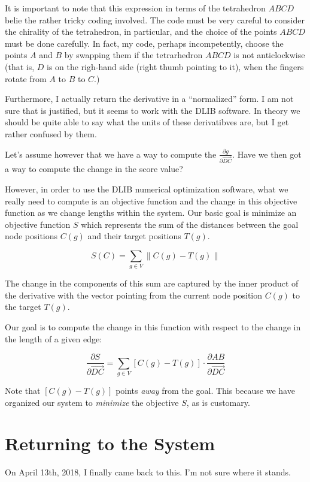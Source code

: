 \documentclass[11pt]{article}
\begin{document}
 It is important to note that this expression in terms of the tetrahedron $ABCD$ belie the rather tricky coding
 involved. The code must be very careful to consider the chirality of the tetrahedron, in particular, and
 the choice of the points $ABCD$ must be done carefully. In fact, my code, perhaps incompetently, choose the points $A$ and $B$
 by swapping them if the tetrarhedron $ABCD$ is not anticlockwise (that is, $D$ is on the righ-hand side (right thumb pointing to it),
 when the fingers rotate from $A$ to $B$ to $C$.)

 Furthermore, I actually return the derivative in a ``normalized'' form. I am not sure that is justified, but it seems to work with the
 DLIB software. In theory we should be quite able to say what the units of these derivatibves are, but I get rather confused by them.
 
Let's assume however that we have a way to compute the $\frac{\partial g}{\partial \overrightarrow{DC}}$. Have we then got a way to compute
the change in the score value?

However, in order to use the DLIB numerical optimization software, what we really need to compute is
an objective function and the change in this objective function as we change lengths within the system.
Our basic goal is minimize an objective function $S$ which represents the sum of the distances between the
goal node positions $C(g)$  and their target positions $T(g)$.

\[
S(C) = \sum_{g\in V} \| C(g) - T(g) \|
\]

The change in the components of this sum are captured by the inner product of the derivative with the vector
pointing from the current node position $C(g)$ to the target $T(g)$.

Our goal is to compute the change in this function with respect to the change in the length of a given edge:

\[
\frac{\partial S}{\partial \overrightarrow{DC}} =
\sum_{g\in V} [C(g) - T(g)] \cdot \frac{\partial AB }{\partial \overrightarrow{DC}} 
\]

Note that $[C(g) - T(g)]$ points {\em away} from the goal. This because we have organized our system to {\em minimize} the objective $S$,
as is customary.


\section{Returning to the System}

On April 13th, 2018, I finally came back to this. I'm not sure where it stands.
\end{document}

